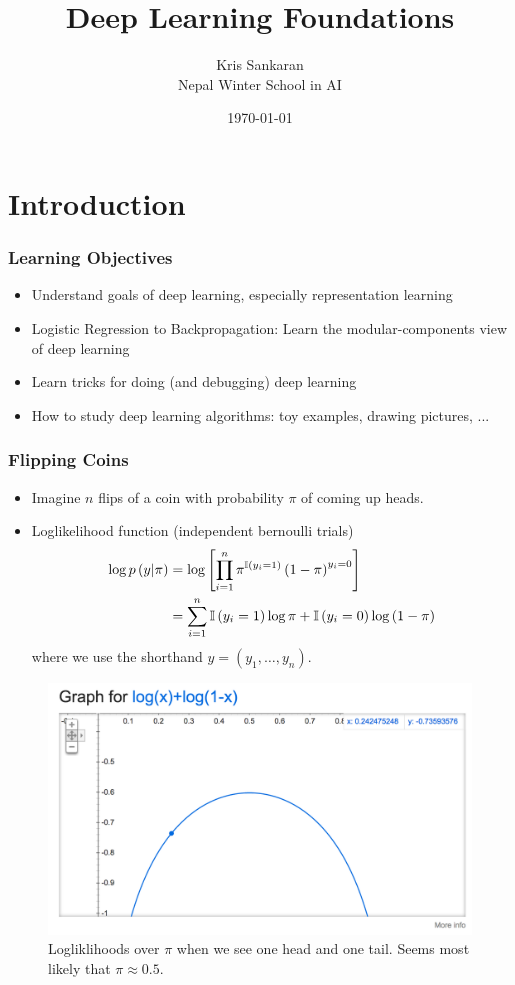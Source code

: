 \documentclass[10pt,mathserif]{beamer}
\title{\large \bfseries Deep Learning Foundations}
\author{Kris Sankaran\\[3ex] Nepal Winter School in AI}
\date{\today}
\begin{document}
\maketitle

\section{Introduction}
\label{sec:introduction}

\begin{frame}
  \frametitle{Learning Objectives}
  \begin{itemize}
    \item Understand goals of deep learning, especially representation learning
    \item Logistic Regression to Backpropagation: Learn the modular-components
      view of deep learning
    \item Learn tricks for doing (and debugging) deep learning
    \item How to study deep learning algorithms: toy examples,
      drawing pictures, ...
  \end{itemize}
\end{frame}

\begin{frame}
  \frametitle{Flipping Coins}
  \begin{itemize}
  \item Imagine $n$ flips of a coin with probability $\pi$ of coming up heads.
  \item Loglikelihood function (independent bernoulli trials)
    \begin{align*}
      \log p\left(y \vert \pi \right) &= \log \left[\prod_{i = 1}^{n} \pi^{\mathbb{I}\left({y_i = 1}\right)}\left(1 - \pi\right)^{y_i = 0}\right] \\
      &= \sum_{i = 1}^{n} \mathbb{I}\left({y_i = 1}\right)\log \pi + \mathbb{I}\left({y_i = 0}\right)\log\left(1 - \pi\right)
    \end{align*}
    where we use the shorthand $y = \left(y_1, \dots, y_n\right)$.
  \end{itemize}
  \begin{figure}[ht]
    \centering
    \includegraphics[width=0.3\paperwidth]{figure/loglikelihood_bernoulli}
    \caption{Logliklihoods over $\pi$ when we see one head and one tail. Seems
      most likely that $\pi \approx 0.5$. \label{fig:loglikelihood_bernoulli} }
  \end{figure}
\end{frame}
\end{document}
